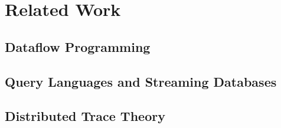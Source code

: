 \section{Related Work}

\subsection{Dataflow Programming}

\subsection{Query Languages and Streaming Databases}

\subsection{Distributed Trace Theory}
